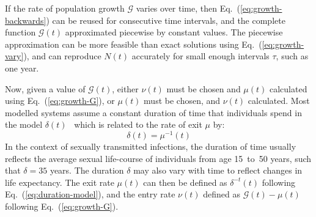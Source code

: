 If the rate of population growth $\mathcal{G}$ varies over time,
then Eq.~(\ref{eq:growth-backwards}) can be reused for consecutive time intervals,
and the complete function $\mathcal{G}(t)$ approximated piecewise by constant values.
The piecewise approximation can be more feasible
than exact solutions using Eq.~(\ref{eq:growth-vary}),
and can reproduce $N(t)$ accurately for small enough intervals $\tau$,
such as one year.
\par
Now, given a value of $\mathcal{G}(t)$,
either $\nu(t)$ must be chosen and $\mu(t)$ calculated using Eq.~(\ref{eq:growth-G}),
or $\mu(t)$ must be chosen, and $\nu(t)$ calculated.
Most modelled systems assume
a constant duration of time that individuals spend in the model $\delta(t)$~\citep{Anderson1991}
which is related to the rate of exit $\mu$ by:
\begin{equation}\label{eq:duration-model}
\delta(t) = \mu^{-1}(t)
\end{equation}
In the context of sexually transmitted infections, the duration of time usually reflects
the average sexual life-course of individuals from age 15~to~50 years,
such that $\delta = 35$ years.
The duration $\delta$ may also vary with time to reflect changes in life expectancy.
The exit rate $\mu(t)$ can then be defined as $\delta^{-t}(t)$
following Eq.~(\ref{eq:duration-model}),
and the entry rate $\nu(t)$ defined as $\mathcal{G}(t) - \mu(t)$
following Eq.~(\ref{eq:growth-G}).
